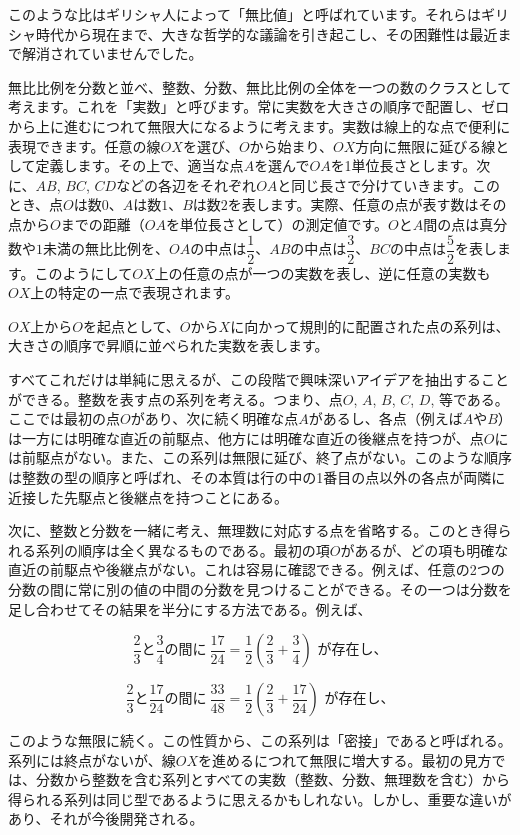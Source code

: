 \documentclass[a4paper,11pt,openany]{ltjsbook}
\begin{document}
このような比はギリシャ人によって「無比値」と呼ばれています。それらはギリシャ時代から現在まで、大きな哲学的な議論を引き起こし、その困難性は最近まで解消されていませんでした。

無比比例を分数と並べ、整数、分数、無比比例の全体を一つの数のクラスとして考えます。これを「実数」と呼びます。常に実数を大きさの順序で配置し、ゼロから上に進むにつれて無限大になるように考えます。実数は線上的な点で便利に表現できます。任意の線$OX$を選び、$O$から始まり、$OX$方向に無限に延びる線として定義します。その上で、適当な点$A$を選んで$OA$を1単位長さとします。次に、$AB$, $BC$, $CD$などの各辺をそれぞれ$OA$と同じ長さで分けていきます。このとき、点$O$は数$0$、$A$は数$1$、$B$は数$2$を表します。実際、任意の点が表す数はその点から$O$までの距離（$OA$を単位長さとして）の測定値です。$O$と$A$間の点は真分数や$1$未満の無比比例を、$OA$の中点は$\dfrac{1}{2}$、$AB$の中点は$\dfrac{3}{2}$、$BC$の中点は$\dfrac{5}{2}$を表します。このようにして$OX$上の任意の点が一つの実数を表し、逆に任意の実数も$OX$上の特定の一点で表現されます。

$OX$上から$O$を起点として、$O$から$X$に向かって規則的に配置された点の系列は、大きさの順序で昇順に並べられた実数を表します。

すべてこれだけは単純に思えるが、この段階で興味深いアイデアを抽出することができる。整数を表す点の系列を考える。つまり、点$O$, $A$, $B$, $C$, $D$, 等である。ここでは最初の点$O$があり、次に続く明確な点$A$があるし、各点（例えば$A$や$B$）は一方には明確な直近の前駆点、他方には明確な直近の後継点を持つが、点$O$には前駆点がない。また、この系列は無限に延び、終了点がない。このような順序は整数の型の順序と呼ばれ、その本質は行の中の1番目の点以外の各点が両隣に近接した先駆点と後継点を持つことにある。

次に、整数と分数を一緒に考え、無理数に対応する点を省略する。このとき得られる系列の順序は全く異なるものである。最初の項$O$があるが、どの項も明確な直近の前駆点や後継点がない。これは容易に確認できる。例えば、任意の2つの分数の間に常に別の値の中間の分数を見つけることができる。その一つは分数を足し合わせてその結果を半分にする方法である。例えば、

\[
\frac{2}{3} \text{と} \frac{3}{4} \text{の間に} \ \frac{17}{24} = \frac{1}{2} \left( \frac{2}{3} + \frac{3}{4} \right) \text{ が存在し、}
\]

\[
\frac{2}{3} \text{と} \frac{17}{24} \text{の間に} \ \frac{33}{48} = \frac{1}{2} \left( \frac{2}{3} + \frac{17}{24} \right) \text{ が存在し、}
\]

このような無限に続く。この性質から、この系列は「密接」であると呼ばれる。系列には終点がないが、線$OX$を進めるにつれて無限に増大する。最初の見方では、分数から整数を含む系列とすべての実数（整数、分数、無理数を含む）から得られる系列は同じ型であるように思えるかもしれない。しかし、重要な違いがあり、それが今後開発される。
\end{document}
